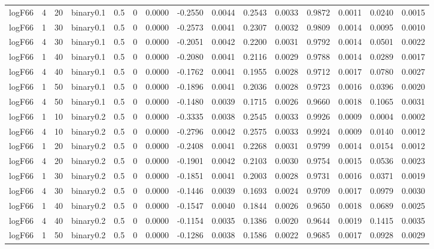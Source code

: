 \begin{longtable}{rrrrrrrrrrrrrrr}
  logF66 & 4 & 20 & binary0.1 & 0.5 & 0 & 0.0000 & -0.2550 & 0.0044 & 0.2543 & 0.0033 & 0.9872 & 0.0011 & 0.0240 & 0.0015 \\ 
  logF66 & 1 & 30 & binary0.1 & 0.5 & 0 & 0.0000 & -0.2573 & 0.0041 & 0.2307 & 0.0032 & 0.9809 & 0.0014 & 0.0095 & 0.0010 \\ 
  logF66 & 4 & 30 & binary0.1 & 0.5 & 0 & 0.0000 & -0.2051 & 0.0042 & 0.2200 & 0.0031 & 0.9792 & 0.0014 & 0.0501 & 0.0022 \\ 
  logF66 & 1 & 40 & binary0.1 & 0.5 & 0 & 0.0000 & -0.2080 & 0.0041 & 0.2116 & 0.0029 & 0.9788 & 0.0014 & 0.0289 & 0.0017 \\ 
  logF66 & 4 & 40 & binary0.1 & 0.5 & 0 & 0.0000 & -0.1762 & 0.0041 & 0.1955 & 0.0028 & 0.9712 & 0.0017 & 0.0780 & 0.0027 \\ 
  logF66 & 1 & 50 & binary0.1 & 0.5 & 0 & 0.0000 & -0.1896 & 0.0041 & 0.2036 & 0.0028 & 0.9723 & 0.0016 & 0.0396 & 0.0020 \\ 
  logF66 & 4 & 50 & binary0.1 & 0.5 & 0 & 0.0000 & -0.1480 & 0.0039 & 0.1715 & 0.0026 & 0.9660 & 0.0018 & 0.1065 & 0.0031 \\ 
  logF66 & 1 & 10 & binary0.2 & 0.5 & 0 & 0.0000 & -0.3335 & 0.0038 & 0.2545 & 0.0033 & 0.9926 & 0.0009 & 0.0004 & 0.0002 \\ 
  logF66 & 4 & 10 & binary0.2 & 0.5 & 0 & 0.0000 & -0.2796 & 0.0042 & 0.2575 & 0.0033 & 0.9924 & 0.0009 & 0.0140 & 0.0012 \\ 
  logF66 & 1 & 20 & binary0.2 & 0.5 & 0 & 0.0000 & -0.2408 & 0.0041 & 0.2268 & 0.0031 & 0.9799 & 0.0014 & 0.0154 & 0.0012 \\ 
  logF66 & 4 & 20 & binary0.2 & 0.5 & 0 & 0.0000 & -0.1901 & 0.0042 & 0.2103 & 0.0030 & 0.9754 & 0.0015 & 0.0536 & 0.0023 \\ 
  logF66 & 1 & 30 & binary0.2 & 0.5 & 0 & 0.0000 & -0.1851 & 0.0041 & 0.2003 & 0.0028 & 0.9731 & 0.0016 & 0.0371 & 0.0019 \\ 
  logF66 & 4 & 30 & binary0.2 & 0.5 & 0 & 0.0000 & -0.1446 & 0.0039 & 0.1693 & 0.0024 & 0.9709 & 0.0017 & 0.0979 & 0.0030 \\ 
  logF66 & 1 & 40 & binary0.2 & 0.5 & 0 & 0.0000 & -0.1547 & 0.0040 & 0.1844 & 0.0026 & 0.9650 & 0.0018 & 0.0689 & 0.0025 \\ 
  logF66 & 4 & 40 & binary0.2 & 0.5 & 0 & 0.0000 & -0.1154 & 0.0035 & 0.1386 & 0.0020 & 0.9644 & 0.0019 & 0.1415 & 0.0035 \\ 
  logF66 & 1 & 50 & binary0.2 & 0.5 & 0 & 0.0000 & -0.1286 & 0.0038 & 0.1586 & 0.0022 & 0.9685 & 0.0017 & 0.0928 & 0.0029 \\ 

\end{longtable}
